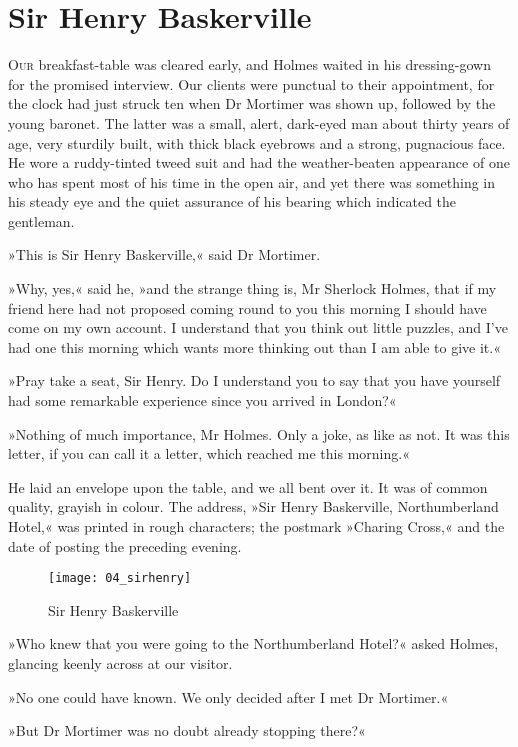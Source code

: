 \chapter{Sir Henry Baskerville}
\lettrine[lines=4]{O}{ur} breakfast-table was cleared early, and Holmes waited in his dressing-gown for the promised interview. Our clients were punctual to their appointment, for the clock had just struck ten when Dr Mortimer was shown up, followed by the young baronet. The latter was a small, alert, dark-eyed man about thirty years of age, very sturdily built, with thick black eyebrows and a strong, pugnacious face. He wore a ruddy-tinted tweed suit and had the weather-beaten appearance of one who has spent most of his time in the open air, and yet there was something in his steady eye and the quiet assurance of his bearing which indicated the gentleman.

»This is Sir Henry Baskerville,« said Dr Mortimer.

»Why, yes,« said he, »and the strange thing is, Mr Sherlock Holmes, that if my friend here had not proposed coming round to you this morning I should have come on my own account. I understand that you think out little puzzles, and I've had one this morning which wants more thinking out than I am able to give it.«

»Pray take a seat, Sir Henry. Do I understand you to say that you have yourself had some remarkable experience since you arrived in London?«

»Nothing of much importance, Mr Holmes. Only a joke, as like as not. It was this letter, if you can call it a letter, which reached me this morning.«

He laid an envelope upon the table, and we all bent over it. It was of common quality, grayish in colour. The address, »Sir Henry Baskerville, Northumberland Hotel,« was printed in rough characters; the postmark »Charing Cross,« and the date of posting the preceding evening.

\begin{figure}[p]
\centering
\texttt{[image: 04\_sirhenry]}
\caption{Sir Henry Baskerville}
\end{figure}

»Who knew that you were going to the Northumberland Hotel?« asked Holmes, glancing keenly across at our visitor.

»No one could have known. We only decided after I met Dr Mortimer.«

»But Dr Mortimer was no doubt already stopping there?«

